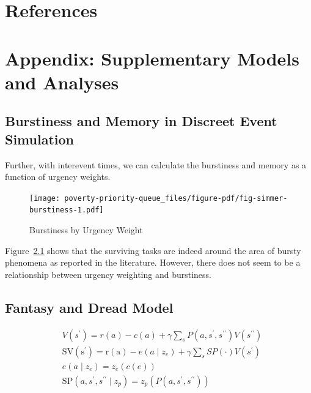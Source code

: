 \documentclass[
]{report}
\begin{document}
\hypertarget{references}{%
\chapter{References}\label{references}}

\hypertarget{appendix-supplementary-models-and-analyses}{%
\chapter{Appendix: Supplementary Models and
Analyses}\label{appendix-supplementary-models-and-analyses}}

\hypertarget{burstiness-and-memory-in-discreet-event-simulation}{%
\section{Burstiness and Memory in Discreet Event
Simulation}\label{burstiness-and-memory-in-discreet-event-simulation}}

Further, with interevent times, we can calculate the burstiness and
memory as a function of urgency weights.

\begin{figure}

{\centering \texttt{[image: poverty-priority-queue\_files/figure-pdf/fig-simmer-burstiness-1.pdf]}

}

\caption{\label{fig-simmer-burstiness}Burstiness by Urgency Weight}

\end{figure}

Figure~\ref{fig-simmer-burstiness} shows that the surviving tasks are
indeed around the area of bursty phenomena as reported in the
literature. However, there does not seem to be a relationship between
urgency weighting and burstiness.

\hypertarget{fantasy-and-dread-model}{%
\section{Fantasy and Dread Model}\label{fantasy-and-dread-model}}

\[
\begin{aligned}
& V\left(s^{\prime}\right)=r(a)-c(a)+\gamma \sum_s P\left(a, s^{\prime}, s^{\prime \prime}\right) V\left(s^{\prime \prime}\right) \\
& \mathrm{SV}\left(\mathrm{s}^{\prime}\right)=\mathrm{r}(\mathrm{a})-e\left(a \mid z_e\right)+\gamma \sum_s S P(\cdot) V\left(s^{\prime}\right) \\
& e\left(a \mid z_e\right)=z_e(c(e)) \\
& \mathrm{SP}\left(a, s^{\prime}, s^{\prime \prime} \mid z_p\right)=z_p\left(P\left(a, s^{\prime}, s^{\prime \prime}\right)\right)
\end{aligned}
\]
\end{document}
